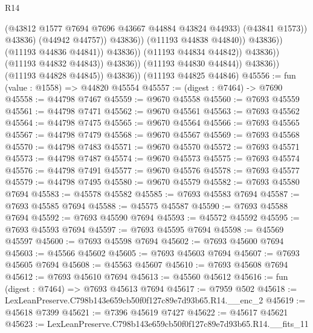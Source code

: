 \begin{lexlean}{R14}
\begin{coremodule}
                                                  (@43812
                                                    @1577
                                                    @7694
                                                    @7696
                                                    @43667
                                                    @44884
                                                    @43824
                                                    @44933)
                                                  (@43841 @1573))
                                                @43836)
                                              (@44942 @44757))
                                            @43836))
                                        (@11193 @44838 @44840))
                                      @43836))
                                  (@11193 @44836 @44841))
                                @43836))
                            (@11193 @44834 @44842))
                          @43836))
                      (@11193 @44832 @44843))
                    @43836))
                (@11193 @44830 @44844))
              @43836))
          (@11193 @44828 @44845))
        @43836))
    (@11193 @44825 @44846)
@45556 := fun (value : @1558) => @44820 @45554
@45557 := (digest : @7464) -> @7690
@45558 := @44798 @7467
@45559 := @9670 @45558
@45560 := @7693 @45559
@45561 := @44798 @7471
@45562 := @9670 @45561
@45563 := @7693 @45562
@45564 := @44798 @7475
@45565 := @9670 @45564
@45566 := @7693 @45565
@45567 := @44798 @7479
@45568 := @9670 @45567
@45569 := @7693 @45568
@45570 := @44798 @7483
@45571 := @9670 @45570
@45572 := @7693 @45571
@45573 := @44798 @7487
@45574 := @9670 @45573
@45575 := @7693 @45574
@45576 := @44798 @7491
@45577 := @9670 @45576
@45578 := @7693 @45577
@45579 := @44798 @7495
@45580 := @9670 @45579
@45582 := @7693 @45580 @7694
@45583 := @45578 @45582
@45585 := @7693 @45583 @7694
@45587 := @7693 @45585 @7694
@45588 := @45575 @45587
@45590 := @7693 @45588 @7694
@45592 := @7693 @45590 @7694
@45593 := @45572 @45592
@45595 := @7693 @45593 @7694
@45597 := @7693 @45595 @7694
@45598 := @45569 @45597
@45600 := @7693 @45598 @7694
@45602 := @7693 @45600 @7694
@45603 := @45566 @45602
@45605 := @7693 @45603 @7694
@45607 := @7693 @45605 @7694
@45608 := @45563 @45607
@45610 := @7693 @45608 @7694
@45612 := @7693 @45610 @7694
@45613 := @45560 @45612
@45616 := fun (digest : @7464) => @7693 @45613 @7694
@45617 := @7959 @502
@45618 := LexLeanPreserve.C798b143e659cb50f0f127c89e7d93b65.R14.__enc_2
@45619 := @45618 @7399
@45621 := @7396 @45619 @7427
@45622 := @45617 @45621
@45623 := LexLeanPreserve.C798b143e659cb50f0f127c89e7d93b65.R14.__fits_11

\end{coremodule}
\end{lexlean}
